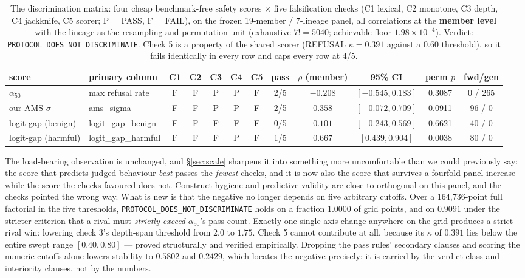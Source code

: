 \documentclass[11pt,letterpaper]{article}
\begin{document}
\begin{table}[!htbp]
\centering
\footnotesize
\setlength{\tabcolsep}{3.5pt}
\begin{tabular}{llcccccccccc}
\toprule
score & primary column & C1 & C2 & C3 & C4 & C5 & pass & $\rho$ (member) & 95\% CI & perm $p$ & fwd/gen \\
\midrule
$\alpha_{50}$ & max refusal rate & F & F & P & P & F & 2/5 & $-0.208$ & $[-0.545, 0.183]$ & 0.3087 & 0 / 265 \\
our-AMS $\sigma$ & ams\_sigma & F & F & P & P & F & 2/5 & $0.358$ & $[-0.072, 0.709]$ & 0.0911 & 96 / 0 \\
logit-gap (benign) & logit\_gap\_benign & F & F & F & F & F & 0/5 & $0.101$ & $[-0.243, 0.569]$ & 0.6621 & 40 / 0 \\
logit-gap (harmful) & logit\_gap\_harmful & F & F & F & P & F & 1/5 & $0.667$ & $[0.439, 0.904]$ & 0.0038 & 80 / 0 \\
\bottomrule
\end{tabular}
\caption{The discrimination matrix: four cheap benchmark-free safety scores $\times$ five falsification checks (C1 lexical, C2 monotone, C3 depth, C4 jackknife, C5 scorer; P = PASS, F = FAIL), on the frozen 19-member / 7-lineage panel, all correlations at the \textbf{member level} with the lineage as the resampling and permutation unit (exhaustive $7! = 5040$; achievable floor $1.98\times10^{-4}$). Verdict: \texttt{PROTOCOL\_DOES\_NOT\_DISCRIMINATE}. Check 5 is a property of the shared scorer (REFUSAL $\kappa = 0.391$ against a $0.60$ threshold), so it fails identically in every row and caps every row at 4/5.}
\label{tab:matrix}
\end{table}

The load-bearing observation is unchanged, and \S\ref{sec:scale} sharpens it into something more uncomfortable than we could previously say: the score that predicts judged behaviour \emph{best} passes the \emph{fewest} checks, and it is now also the score that survives a fourfold panel increase while the score the checks favoured does not. Construct hygiene and predictive validity are close to orthogonal on this panel, and the checks pointed the wrong way. What is new is that the negative no longer depends on five arbitrary cutoffs. Over a 164,736-point full factorial in the five thresholds, \texttt{PROTOCOL\_DOES\_NOT\_DISCRIMINATE} holds on a fraction $1.0000$ of grid points, and on $0.9091$ under the stricter criterion that a rival must \emph{strictly exceed} $\alpha_{50}$'s pass count. Exactly one single-axis change anywhere on the grid produces a strict rival win: lowering check 3's depth-span threshold from $2.0$ to $1.75$. Check 5 cannot contribute at all, because its $\kappa$ of $0.391$ lies below the entire swept range $[0.40, 0.80]$ --- proved structurally and verified empirically. Dropping the pass rules' secondary clauses and scoring the numeric cutoffs alone lowers stability to $0.5802$ and $0.2429$, which locates the negative precisely: it is carried by the verdict-class and interiority clauses, not by the numbers.
\end{document}
